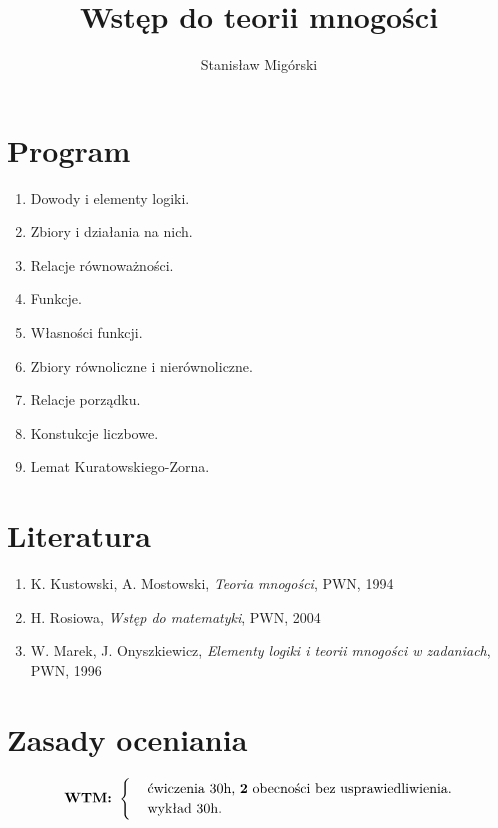 \documentclass[a5paper,8pt]{article}
\title{Wstęp do teorii mnogości}
\author{Stanisław Migórski}
\date{}
\theoremstyle{mythmstyle}
\begin{document}
    \maketitle
    \tableofcontents
    \pagebreak

    \section{Program} %
    \label{sec:program}
        \begin{enumerate}
            \item Dowody i elementy logiki.
            \item Zbiory i działania na nich.
            \item Relacje równoważności.
            \item Funkcje.
            \item Własności funkcji.
            \item Zbiory równoliczne i nierównoliczne.
            \item Relacje porządku.
            \item Konstukcje liczbowe.
            \item Lemat Kuratowskiego-Zorna.
        \end{enumerate}

    \section{Literatura} %
    \label{sec:literatura}
        \begin{enumerate}
            \item K. Kustowski, A. Mostowski, \textit{Teoria mnogości}, PWN, 1994
            \item H. Rosiowa, \textit{Wstęp do matematyki}, PWN, 2004
            \item W. Marek, J. Onyszkiewicz, \textit{Elementy logiki i teorii mnogości w zadaniach}, PWN, 1996
        \end{enumerate}

    \section{Zasady oceniania} %
    \label{sec:zasady_oceniania}

        \begin{equation*}
          \textbf{WTM:  }\begin{cases}
            & \text{ćwiczenia 30h, \textbf{2} obecności bez usprawiedliwienia}.\\
            & \text{wykład 30h}.
          \end{cases}
        \end{equation*}
\end{document}
